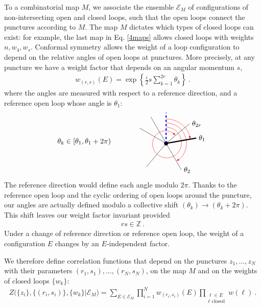 \documentclass[12pt, a4paper]{article}
\theoremstyle{break}
\begin{document}
To a combinatorial map $M$, we associate the ensemble $\mathcal{E}_M$ of configurations of non-intersecting open and closed loops, such that the open loops connect the punctures according to $M$. The map $M$ dictates which types of closed loops can exist: for example, the last map in Eq. \eqref{4maps} allows closed loops with weights $n,w_4,w_s$. Conformal symmetry allows the weight of a loop configuration to depend on the relative angles of open loops at punctures. More precisely, at any puncture we have a weight factor that depends on an angular momentum $s$,
\begin{align}
 \boxed{w_{(r,s)}(E) = \exp \left\{\tfrac{i}{2} s\textstyle{\sum}_{k=1}^{2r}\theta_{k}\right\}}\ .
 \label{wrs}
\end{align}
where the angles are measured with respect to a reference direction, and a reference open loop whose angle is $\theta_1$:
\begin{align}
 \theta_{k}\in [\theta_{1}, \theta_{1}+2\pi)
\qquad \qquad 
 \begin{tikzpicture}[baseline=(base), scale = .5]
  \coordinate (base) at (0, 0);
  \draw [domain=0:410,variable=\t,smooth,samples=35,red,-latex]
        plot ({90-\t}: {1.6- \t/1000});
  \draw[-latex, red] (0, 2.4) arc (90:10:2.4);
  \draw[-latex, red] (0, 2) arc (90:-60:2);
  \draw (0, 0) node[fill, circle, minimum size = 2mm, inner sep = 0]{};
  \foreach\t in {10, 40, 120, 150, 230, 300}{
  \draw (0, 0) -- ++(\t:3);
  }
  \draw[ultra thick, blue, dashed] (0, 0) -- ++(90:3);
  \draw[ultra thick] (0, 0) -- ++(10:3);
  \node[right] at ++(10:3) {$\theta_{1}$};
  \node[right] at ++(300:3) {$\theta_{2}$};
  \node[right] at ++(40:3) {$\theta_{2r}$};
 \end{tikzpicture}
 \label{titt}
\end{align}
The reference direction would define each angle modulo $2\pi$. Thanks to the reference open loop and the cyclic ordering of open loops around the puncture, our angles are actually defined modulo a collective shift $(\theta_k) \to (\theta_k+2\pi)$. This shift leaves our weight factor invariant provided 
\begin{align}
 rs\in \mathbb{Z}\ . 
\end{align}
Under a change of reference direction or reference open loop, the weight of a configuration $E$ changes by an $E$-independent factor.

We therefore define correlation functions that depend on the punctures $z_1,\dots,z_N$ with their parameters $(r_1,s_1),\dots, (r_N,s_N)$, on the map $M$ and on the weights of closed loops $\{w_k\}$:
\begin{align}
 \boxed{Z\Big(\{z_i\},\{(r_i,s_i)\},\{w_k\}\Big|\mathcal{E}_M\Big) =\sum_{E\in\mathcal{E}_M} \prod_{i=1}^N w_{(r_i,s_i)}(E) \prod_{\substack{\ell\in E\\ \ell \text{ closed}}} w(\ell)} \ .
 \label{zbig}
\end{align}
\end{document}
